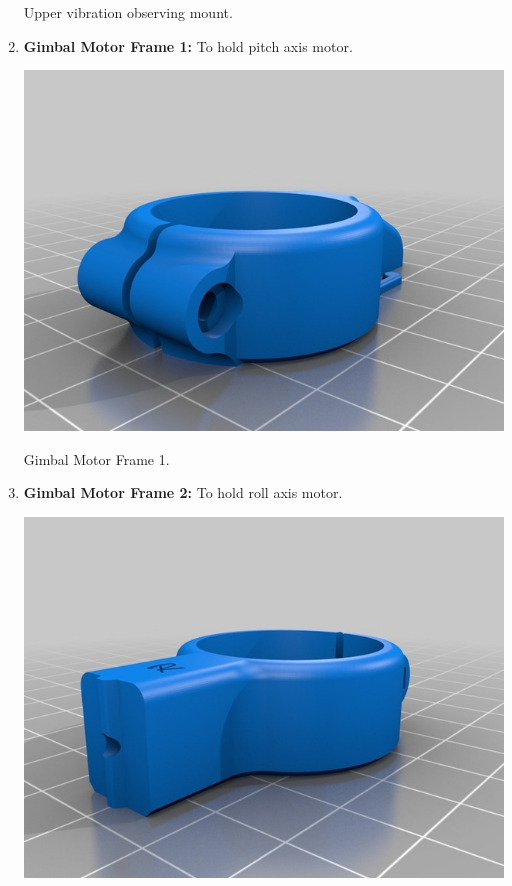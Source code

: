 \documentclass[11pt,a4paper]{article}
\begin{document}
\begin{enumerate}
			\begin{center}
				Upper vibration observing mount.
			\end{center}
			\item \textbf{Gimbal Motor Frame 1:} To hold pitch axis motor.
			\begin{center}
				\includegraphics[scale=0.5]{Gimbal_Motor_Frame_1.jpg}
			\end{center}
			\begin{center}
				Gimbal Motor Frame 1.
			\end{center}
			\item \textbf{Gimbal Motor Frame 2:} To hold roll axis motor.
			\begin{center}
				\includegraphics[scale=0.5]{Gimbal_Motor_Frame_2.jpg}

\end{center}
\end{enumerate}
\end{document}
